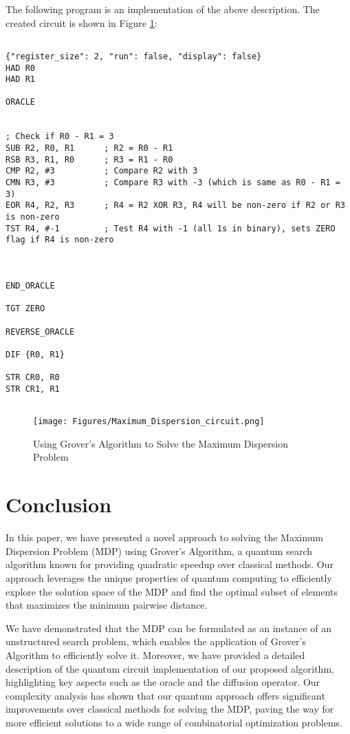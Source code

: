 The following program is an implementation of the above description. The created circuit is shown in Figure \ref{fig:Maximum_Dispersion}:

\begin{lstlisting}

{"register_size": 2, "run": false, "display": false}
HAD R0
HAD R1

ORACLE


; Check if R0 - R1 = 3
SUB R2, R0, R1      ; R2 = R0 - R1
RSB R3, R1, R0      ; R3 = R1 - R0
CMP R2, #3          ; Compare R2 with 3
CMN R3, #3          ; Compare R3 with -3 (which is same as R0 - R1 = 3)
EOR R4, R2, R3      ; R4 = R2 XOR R3, R4 will be non-zero if R2 or R3 is non-zero
TST R4, #-1         ; Test R4 with -1 (all 1s in binary), sets ZERO flag if R4 is non-zero



END_ORACLE

TGT ZERO

REVERSE_ORACLE

DIF {R0, R1}

STR CR0, R0
STR CR1, R1


\end{lstlisting}

\begin{figure}[htp]
    \centering
    \texttt{[image: Figures/Maximum\_Dispersion\_circuit.png]}
    \caption{Using Grover's Algorithm to Solve the Maximum Dispersion Problem}
    \label{fig:Maximum_Dispersion}
\end{figure}

\section{Conclusion}
\label{sec:conclusion}
In this paper, we have presented a novel approach to solving the Maximum Dispersion Problem (MDP) using Grover's Algorithm, a quantum search algorithm known for providing quadratic speedup over classical methods. Our approach leverages the unique properties of quantum computing to efficiently explore the solution space of the MDP and find the optimal subset of elements that maximizes the minimum pairwise distance.

We have demonstrated that the MDP can be formulated as an instance of an unstructured search problem, which enables the application of Grover's Algorithm to efficiently solve it. Moreover, we have provided a detailed description of the quantum circuit implementation of our proposed algorithm, highlighting key aspects such as the oracle and the diffusion operator. Our complexity analysis has shown that our quantum approach offers significant improvements over classical methods for solving the MDP, paving the way for more efficient solutions to a wide range of combinatorial optimization problems.

